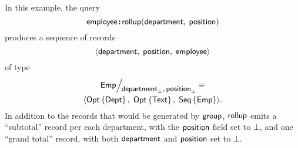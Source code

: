 In this example, the query
\begin{equation*}
    \textup{\textsf{employee}}\!\boldsymbol{:}\!\textup{\textsf{rollup}}(\textup{\textsf{department}},\; \textup{\textsf{position}})
\end{equation*}
produces a sequence of records
\begin{equation*}
    \langle \textup{\textsf{department}},\;\textup{\textsf{position}},\;\textup{\textsf{employee}} \rangle
\end{equation*}
of type
\begin{multline*}
    \Quotient{\Emp}{\Department_{\bot},\Position_{\bot}} \equiv \\
    \Tuple{\Opt{\Dept},\; \Opt{\Text},\; \Seq{\Emp}}.
\end{multline*}
In addition to the records that would be generated by $\textup{\textsf{group}}$, $\textup{\textsf{rollup}}$ emits
a ``subtotal'' record per each department, with the $\textup{\textsf{position}}$ field set to
$\bot$, and one ``grand total'' record, with both $\textup{\textsf{department}}$ and $\textup{\textsf{position}}$
set to $\bot$.

